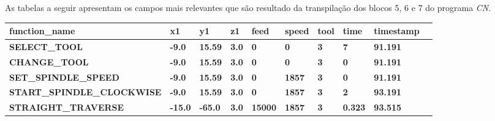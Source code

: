 \documentclass[aspectratio=169]{beamer}
\begin{document}
{\begin{frame}[fragile]
  As tabelas a seguir apresentam os campos mais relevantes que são 
  resultado da transpilação dos blocos 5, 6 e 7 do programa \emph{CN}.

  \vspace{3mm}

  \begin{tabular}{|l|l|l|l|l|l|l|l|l|l|}

    \hline

    \tiny{\bfseries{function\_name}} & 
    \tiny{\bfseries{x1}} & 
    \tiny{\bfseries{y1}} & 
    \tiny{\bfseries{z1}} & 
    \tiny{\bfseries{feed}} & 
    \tiny{\bfseries{speed}} & 
    \tiny{\bfseries{tool}} & 
    \tiny{\bfseries{time}} & 
    \tiny{\bfseries{timestamp}} \\
    \hline

    \tiny{\bfseries{SELECT\_TOOL}} & 
    \tiny{\bfseries{-9.0}} & 
    \tiny{\bfseries{15.59}} & 
    \tiny{\bfseries{3.0}} & 
    \tiny{\bfseries{0}} & 
    \tiny{\bfseries{0}} & 
    \tiny{\bfseries{3}} & 
    \tiny{\bfseries{7}} & 
    \tiny{\bfseries{91.191}} \\    
    \hline

    \tiny{\bfseries{CHANGE\_TOOL}} & 
    \tiny{\bfseries{-9.0}} & 
    \tiny{\bfseries{15.59}} & 
    \tiny{\bfseries{3.0}} & 
    \tiny{\bfseries{0}} & 
    \tiny{\bfseries{0}} & 
    \tiny{\bfseries{3}} & 
    \tiny{\bfseries{0}} & 
    \tiny{\bfseries{91.191}} \\
    \hline

    \tiny{\bfseries{SET\_SPINDLE\_SPEED}} & 
    \tiny{\bfseries{-9.0}} & 
    \tiny{\bfseries{15.59}} & 
    \tiny{\bfseries{3.0}} & 
    \tiny{\bfseries{0}} & 
    \tiny{\bfseries{1857}} & 
    \tiny{\bfseries{3}} & 
    \tiny{\bfseries{0}} & 
    \tiny{\bfseries{91.191}} \\
    \hline

    \tiny{\bfseries{START\_SPINDLE\_CLOCKWISE}} & 
    \tiny{\bfseries{-9.0}} & 
    \tiny{\bfseries{15.59}} & 
    \tiny{\bfseries{3.0}} & 
    \tiny{\bfseries{0}} & 
    \tiny{\bfseries{1857}} & 
    \tiny{\bfseries{3}} & 
    \tiny{\bfseries{2}} & 
    \tiny{\bfseries{93.191}} \\
    \hline    

    \tiny{\bfseries{STRAIGHT\_TRAVERSE}} & 
    \tiny{\bfseries{-15.0}} & 
    \tiny{\bfseries{-65.0}} & 
    \tiny{\bfseries{3.0}} & 
    \tiny{\bfseries{15000}} & 
    \tiny{\bfseries{1857}} & 
    \tiny{\bfseries{3}} & 
    \tiny{\bfseries{0.323}} & 
    \tiny{\bfseries{93.515}} \\
    \hline


\end{tabular}
\end{frame}}
\end{document}

